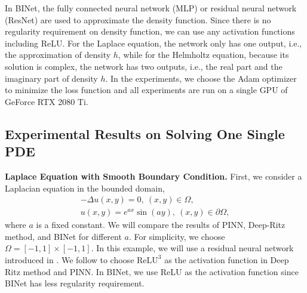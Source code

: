 \documentclass[hyperref]{article}
\numberwithin{equation}{section}
\theoremstyle{nonumberplain}
\begin{document}
	
	
	In BINet, the fully connected neural network (MLP) or residual neural network (ResNet) are used to approximate the density function. Since there is no regularity requirement on density function, we can use any activation functions including ReLU. For the Laplace equation, the network only has one output, i.e., the approximation of density $h$, while for the Helmholtz equation, because its solution is complex, the network has two outputs, i.e., the real part and the imaginary part of density $h$. 
	In the experiments, we choose the Adam optimizer to minimize the loss function and all experiments are run on a single GPU of GeForce RTX 2080 Ti.
	
	
	\subsection{Experimental Results on Solving One Single PDE}
	\textbf{Laplace Equation with Smooth Boundary Condition.} 
	First, we consider a Laplacian equation in the bounded domain,
	\begin{equation}
		\begin{aligned}
			-\Delta u(x,y) = 0, \ (x,y)\in\Omega,\\
			u(x,y) = e^{ax}\sin(ay), \ (x,y)\in\partial\Omega,
		\end{aligned}
		\label{Ex1_eq}
	\end{equation}
	where $a$ is a fixed constant. We will compare the results of PINN, Deep-Ritz method, and BINet for different $a$. For simplicity, we choose $\Omega=[-1,1]\times[-1,1]$. In this example, we will use a residual neural network introduced in \cite{weinan2018deep}. We follow \cite{weinan2018deep} to choose $\text{ReLU}^3$ as the activation function in Deep Ritz method and PINN. In BINet, we use ReLU as the activation function since BINet has less regularity requirement. 
	
\end{document}
